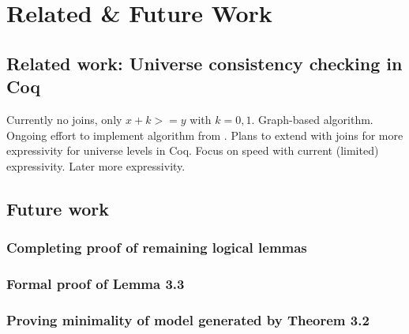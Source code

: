 \chapter{Related \& Future Work}

\section{Related work: Universe consistency checking in Coq}

Currently no joins, only $x + k >= y$ with $k = 0,1$.
Graph-based algorithm. Ongoing effort \cite{coqgithub} to implement algorithm from \cite{mbezem}.
Plans to extend with joins for more expressivity for universe levels in Coq.
Focus on speed with current (limited) expressivity. Later more expressivity.

\section{Future work}

\subsection{Completing proof of remaining logical lemmas}

\subsection{Formal proof of Lemma 3.3}

\subsection{Proving minimality of model generated by Theorem 3.2}

